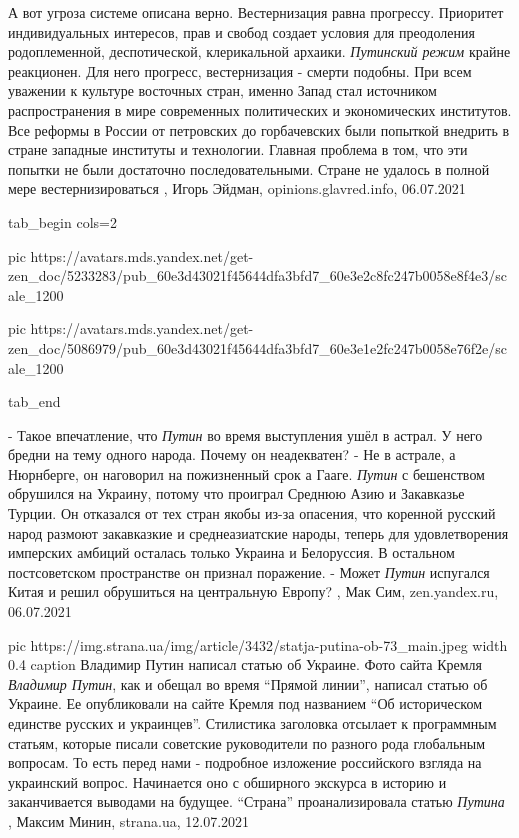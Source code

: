 А вот угроза системе описана верно. Вестернизация равна прогрессу. Приоритет
индивидуальных интересов, прав и свобод создает условия для преодоления
родоплеменной, деспотической, клерикальной архаики. \emph{Путинский режим} крайне
реакционен. Для него прогресс, вестернизация - смерти подобны.
При всем уважении к культуре восточных стран, именно Запад стал источником
распространения в мире современных политических и экономических институтов. Все
реформы в России от петровских до горбачевских были попыткой внедрить в стране
западные институты и технологии. Главная проблема в том, что эти попытки не
были достаточно последовательными. Стране не удалось в полной мере
вестернизироваться
, 
Игорь Эйдман, opinions.glavred.info, 06.07.2021


\ifcmt
  tab_begin cols=2

     pic https://avatars.mds.yandex.net/get-zen_doc/5233283/pub_60e3d43021f45644dfa3bfd7_60e3e2c8fc247b0058e8f4e3/scale_1200

     pic https://avatars.mds.yandex.net/get-zen_doc/5086979/pub_60e3d43021f45644dfa3bfd7_60e3e1e2fc247b0058e76f2e/scale_1200

  tab_end
\fi

- Такое впечатление, что \emph{Путин} во время выступления ушёл в астрал. У
него бредни на тему одного народа. Почему он неадекватен?  - Не в астрале, а
Нюрнберге, он наговорил на пожизненный срок а Гааге. \emph{Путин} с бешенством
обрушился на Украину, потому что проиграл Среднюю Азию и Закавказье Турции. Он
отказался от тех стран якобы из-за опасения, что коренной русский народ
размоют закавказкие и среднеазиатские народы, теперь для удовлетворения
имперских амбиций осталась только Украина и Белоруссия. В остальном
постсоветском пространстве он признал поражение.
- Может \emph{Путин} испугался Китая и решил обрушиться на центральную Европу?
, 
Мак Сим, zen.yandex.ru, 06.07.2021

\ifcmt
  pic https://img.strana.ua/img/article/3432/statja-putina-ob-73_main.jpeg
	width 0.4
	caption Владимир Путин написал статью об Украине. Фото сайта Кремля 
\fi
\emph{Владимир Путин}, как и обещал во время \enquote{Прямой линии}, написал статью об
Украине. Ее опубликовали на сайте Кремля под названием \enquote{Об историческом
единстве русских и украинцев}.  Стилистика заголовка отсылает к программным
статьям, которые писали советские руководители по разного рода глобальным
вопросам. То есть перед нами - подробное изложение российского взгляда на
украинский вопрос.  Начинается оно с обширного экскурса в историю и
заканчивается выводами на будущее.  \enquote{Страна} проанализировала статью \emph{Путина}
, 
Максим Минин, strana.ua, 12.07.2021
